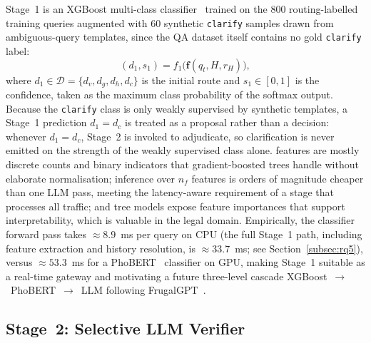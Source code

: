 Stage~1 is an XGBoost multi-class classifier~\cite{chen2016xgboost} trained on
the $800$ routing-labelled training queries augmented with $60$ synthetic
\texttt{clarify} samples drawn from ambiguous-query templates, since the QA
dataset itself contains no gold \texttt{clarify} label:
\begin{equation}
(d_1,s_1) = f_1\bigl(\mathbf{f}(q_t,H,r_H)\bigr),
\label{eq:stage1}
\end{equation}
where $d_1\in\mathcal{D}=\{d_v,d_g,d_h,d_c\}$ is the initial route and
$s_1\in[0,1]$ is the confidence, taken as the maximum class probability of
the softmax output. Because the \texttt{clarify} class is only weakly
supervised by synthetic templates, a Stage~1 prediction $d_1=d_c$ is treated
as a proposal rather than a decision: whenever $d_1=d_c$, Stage~2 is invoked
to adjudicate, so clarification is never emitted on the strength of the
weakly supervised class alone.
features are mostly discrete counts and binary indicators that
gradient-boosted trees handle without elaborate normalisation; inference over
$n_f$ features is orders of magnitude cheaper than one LLM pass, meeting the
latency-aware requirement of a stage that processes all traffic; and tree
models expose feature importances that support interpretability, which is
valuable in the legal domain. Empirically, the classifier forward pass takes
$\approx\!8.9$~ms per query on CPU (the full Stage~1 path, including feature
extraction and history resolution, is $\approx\!33.7$~ms; see
Section~\ref{subsec:rq5}), versus $\approx\!53.3$~ms for a
PhoBERT~\cite{nguyen2020phobert} classifier on GPU, making Stage~1 suitable as
a real-time gateway and motivating a future three-level cascade
XGBoost~$\rightarrow$~PhoBERT~$\rightarrow$~LLM following
FrugalGPT~\cite{chen2023frugalgpt}.

\subsection{Stage~2: Selective LLM Verifier}\label{subsec:stage2}


